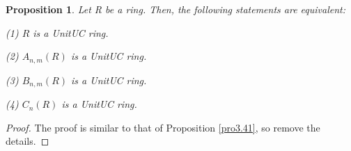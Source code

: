 \documentclass[12pt]{amsart}
\newtheorem{proposition}[theorem]{Proposition}
\theoremstyle{definition}
\begin{document}
\begin{proposition}
Let R be a ring. Then, the following statements are equivalent:

(1) $R$ is a   UnitUC ring. 

(2) $A_{n,m}(R)$ is a   UnitUC ring.

(3) $B_{n,m}(R)$ is a   UnitUC ring.

(4) $C_{n}(R)$ is a   UnitUC ring.

\end{proposition}
\begin{proof}
    The proof is similar to that of Proposition \ref{pro3.41}, so remove the details.
\end{proof}
 

\end{document}
